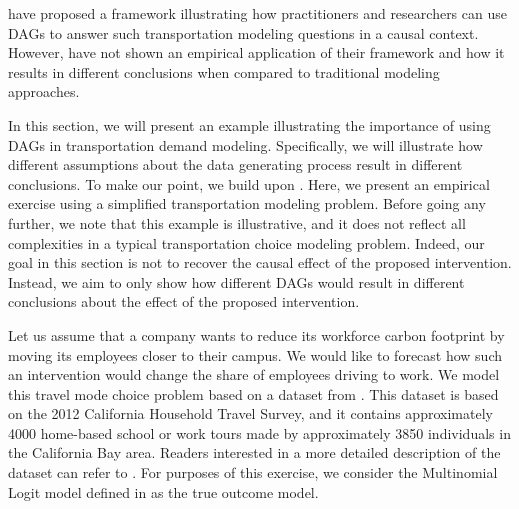 
\citet{brathwaite_2018_causal} have proposed a framework illustrating how practitioners and researchers can use DAGs
 to answer such transportation modeling questions in a causal context.
However, \citet{brathwaite_2018_causal} have not shown an empirical application of their framework and how it results
 in different conclusions when compared to traditional modeling approaches.

In this section, we will present an example illustrating the importance of using DAGs in transportation demand modeling.
Specifically, we will illustrate how different assumptions about the data generating process result in different conclusions.
To make our point, we build upon \citet{brathwaite_2018_causal}.
Here, we present an empirical exercise using a simplified transportation modeling problem.
Before going any further, we note that this example is
illustrative, and it does not reflect all complexities in a typical transportation choice modeling problem.
Indeed, our goal in this section is not to recover the causal effect of the proposed intervention.
Instead, we aim to only show how different DAGs would result in different conclusions about the effect of the proposed intervention.

Let us assume that a company wants to reduce its workforce carbon footprint by moving its employees closer to their campus. 
We would like to forecast how such an intervention would change the share of employees driving to work.
We model this travel mode choice problem based on a dataset from \citet{brathwaite_asymmetric}.
This dataset is based on the 2012 California Household Travel Survey, and it
contains approximately 4000 home-based school or work tours made by approximately 3850 individuals in the California Bay area.
Readers interested in a more detailed description of the dataset can refer to \citet{brathwaite_asymmetric}.
For purposes of this exercise, we consider the Multinomial Logit model defined in \citet{brathwaite_asymmetric} as the true outcome model.

